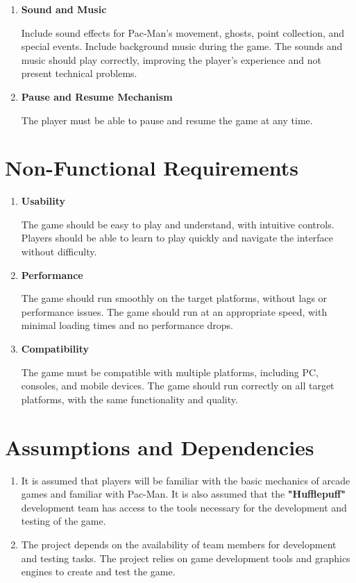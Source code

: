 \documentclass{article}
\begin{document}
\begin{enumerate}
    \item \textbf{Sound and Music}
    
    Include sound effects for Pac-Man's movement, ghosts, point collection, and special events. Include background music during the game. The sounds and music should play correctly, improving the player's experience and not present technical problems.
    
    \item \textbf{Pause and Resume Mechanism}
    
    The player must be able to pause and resume the game at any time.
\end{enumerate}

\section*{Non-Functional Requirements}
\begin{enumerate}
    \item \textbf{Usability}
    
    The game should be easy to play and understand, with intuitive controls. Players should be able to learn to play quickly and navigate the interface without difficulty.
    
    \item \textbf{Performance}
    
    The game should run smoothly on the target platforms, without lags or performance issues. The game should run at an appropriate speed, with minimal loading times and no performance drops.
    
    \item \textbf{Compatibility}
    
    The game must be compatible with multiple platforms, including PC, consoles, and mobile devices. The game should run correctly on all target platforms, with the same functionality and quality.
\end{enumerate}

\section*{Assumptions and Dependencies}
\begin{enumerate}
    \item It is assumed that players will be familiar with the basic mechanics of arcade games and familiar with Pac-Man. It is also assumed that the \textbf{"Hufflepuff"} development team has access to the tools necessary for the development and testing of the game.
    \item The project depends on the availability of team members for development and testing tasks. The project relies on game development tools and graphics engines to create and test the game.
\end{enumerate}
\end{document}
